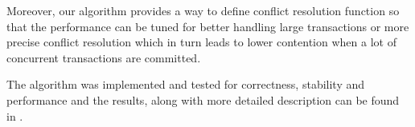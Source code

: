 \documentclass[runningheads,a4paper]{llncs}
\begin{document}
Moreover, our algorithm provides a way to define conflict resolution function so that the performance can be tuned for better handling large transactions or more precise conflict resolution which in turn leads to lower contention when a lot of concurrent transactions are committed. 

The algorithm was implemented and tested for correctness, stability and performance and the results, along with more detailed description can be found in \cite{masterthesis}.

\pagebreak


 
\end{document}
